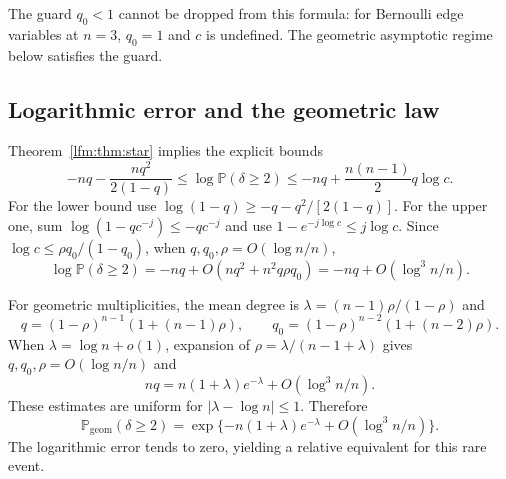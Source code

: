 \documentclass[11pt,letterpaper]{article}
\theoremstyle{remark}\newtheorem{remark}[theorem]{Remark}
\newcommand{\Prob}{\mathbb P}\newcommand{\E}{\mathbb E}
\begin{document}
The guard $q_0<1$ cannot be dropped from this formula: for Bernoulli edge variables at $n=3$, $q_0=1$ and $c$ is undefined. The geometric asymptotic regime below satisfies the guard.

\subsection{Logarithmic error and the geometric law}
Theorem~\ref{lfm:thm:star} implies the explicit bounds
\begin{equation}
 -nq-\frac{nq^2}{2(1-q)}
 \le\log\Prob(\delta\ge2)
 \le-nq+\frac{n(n-1)}2q\log c.\label{lfm:eq:starlog}
\end{equation}
For the lower bound use $\log(1-q)\ge-q-q^2/[2(1-q)]$. For the upper one, sum $\log(1-qc^{-j})\le-qc^{-j}$ and use $1-e^{-j\log c}\le j\log c$. Since $\log c\le\rho q_0/(1-q_0)$, when $q,q_0,\rho=O(\log n/n)$,
\begin{equation}
 \log\Prob(\delta\ge2)=-nq+O(nq^2+n^2q\rho q_0)
 =-nq+O(\log^3n/n).\label{lfm:eq:starerror}
\end{equation}

For geometric multiplicities, the mean degree is $\lambda=(n-1)\rho/(1-\rho)$ and
\[
 q=(1-\rho)^{n-1}(1+(n-1)\rho),\qquad
 q_0=(1-\rho)^{n-2}(1+(n-2)\rho).
\]
When $\lambda=\log n+o(1)$, expansion of
$\rho=\lambda/(n-1+\lambda)$ gives $q,q_0,\rho=O(\log n/n)$ and
\[
 nq=n(1+\lambda)e^{-\lambda}+O(\log^3n/n).
\]
These estimates are uniform for $|\lambda-\log n|\le1$. Therefore
\begin{equation}
 \Prob_{\mathrm{geom}}(\delta\ge2)
 =\exp\{-n(1+\lambda)e^{-\lambda}+O(\log^3n/n)\}.\label{lfm:eq:geomrelative}
\end{equation}
The logarithmic error tends to zero, yielding a relative equivalent for this rare event.
\end{document}
